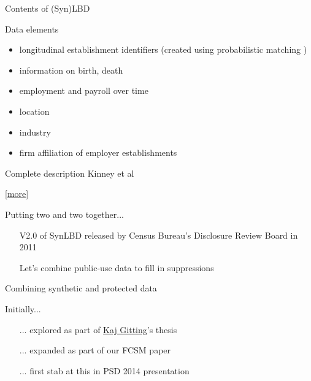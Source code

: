 \begin{frame}{Contents of (Syn)LBD}
\begin{block}{Data elements}
\begin{itemize}
\item  longitudinal establishment identifiers (created using probabilistic matching \cite{MirandaJarmin2002}) 
\item information on birth, death 
\item  employment and payroll over time 
\item location 
\item industry 
\item firm  affiliation of  employer establishments 
\end{itemize}
\end{block}
\pause
\pause
\begin{block}{Complete description}
Kinney et al \cite{KinneyEtAl2011}
\end{block}
\tiny \hfill[\hyperref[sec:SynLBD_details]{more}]
\end{frame}

\begin{frame}
\begin{block}{Putting two and two together...}
\begin{itemize}[<+->]
\item[] 
V2.0 of SynLBD released by Census Bureau's Disclosure Review Board in 2011
\item[]
Let's combine public-use data to fill in suppressions

\end{itemize}
\end{block}
\end{frame}


\begin{frame}{Combining synthetic and protected data}
\begin{block}{Initially...}
\begin{itemize}
\item[...] explored as part of \href{http://www.myweb.ttu.edu/rgitting/}{Kaj Gitting}'s thesis \cite{Gittings2009thesis}
\item[...] expanded as part of our FCSM paper \cite{AbowdEtAl2012}
\item[...] first stab at this in PSD 2014 presentation \cite{psd2014a}
\end{itemize}
\end{block}
\end{frame}


